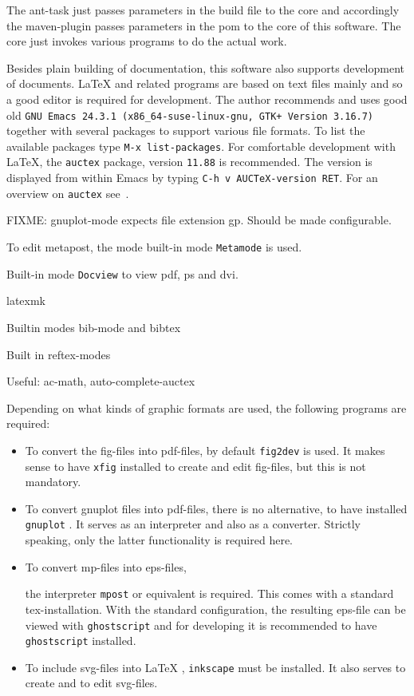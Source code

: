 \documentclass[12pt]{book}
\newcommand{\gls}[1]{#1}
\renewcommand{\index}[1]{ }
\begin{document}
The ant-task just passes parameters in the build file to the core 
and accordingly the maven-plugin passes parameters in the pom 
to the core of this software. 
The core just invokes various programs to do the actual work. 
\index{ant-task}

Besides plain building of documentation, 
this software also supports development of documents. 
\LaTeX{} and related programs are based on text files mainly 
and so a good editor is required for development. 
The author recommends and uses good old 
\texttt{GNU Emacs 24.3.1 (x86\_64-suse-linux-gnu, GTK+ Version 3.16.7)} 
together with several packages to support 
various file formats. 
To list the available packages type 
\texttt{M-x list-packages}. 
For comfortable development with \LaTeX, 
the \texttt{auctex} package, version \texttt{11.88} is recommended. 
The version is displayed from within Emacs 
by typing \texttt{C-h v AUCTeX-version RET}. 
For an overview on \texttt{auctex} see~\cite{AucTeX}. 


FIXME\@: gnuplot-mode expects file extension gp. 
Should be made configurable. 

To edit metapost, the mode built-in mode \texttt{Metamode} is used. 

Built-in mode \texttt{Docview} to view pdf, ps and dvi. 

latexmk

Builtin modes bib-mode and bibtex

Built in reftex-modes

Useful: 
ac-math, auto-complete-auctex

Depending on what kinds of graphic formats are used, 
the following programs are required: 
%
\begin{itemize}
\item
To convert the \gls{fig}-files into \gls{pdf}-files, 
by default \texttt{fig2dev}\index{fig2dev} is used. 
It makes sense to have \texttt{xfig}\index{xfig} installed 
to create and edit fig-files, but this is not mandatory. 
\item
To convert gnuplot files into pdf-files, there is no alternative, 
to have installed \texttt{gnuplot}\index{gnuplot}. 
It serves as an interpreter and also as a converter. 
Strictly speaking, only the latter functionality is required here. 
\item
To convert \gls{mp}-files into \gls{eps}-files, 
\index{mpost}\index{metapost}
the interpreter \texttt{mpost} or equivalent is required. 
This comes with a standard tex-installation. 
With the standard configuration, 
the resulting eps-file can be viewed with \texttt{ghostscript} 
and for developing it is recommended to have \texttt{ghostscript} installed. 
\item
To include \gls{svg}-files into \LaTeX\index{svg}, 
\texttt{inkscape}\index{inkscape} must be installed. 
It also serves to create and to edit svg-files. 
\end{itemize}
\end{document}
